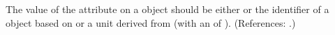 The value of the attribute  on a \Model object should be
either  or the identifier of a \UnitDefinition object
based on  or a unit derived from  (with an
 of ).  (References: .)
